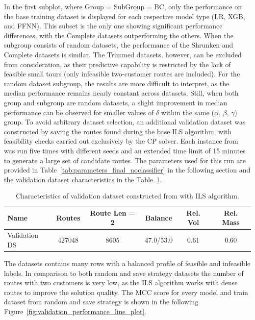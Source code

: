 In the first subplot, where Group = SubGroup = BC, only the performance on the base training dataset is
displayed for each respective model type (\gls{LR}, XGB, and \gls{FFNN}). This subset is the only one showing significant
performance differences, with the Complete datasets outperforming the others. When the subgroup consists of random datasets,
the performance of the Shrunken and Complete datasets is similar. The Trimmed datasets, however, can be excluded from consideration,
as their predictive capability is restricted by the lack of feasible small tours (only infeasible two-customer routes are included).
For the random dataset subgroup, the results are more difficult to interpret, as the median performance remains nearly constant
across datasets. Still, when both group and subgroup are random datasets, a slight improvement in median performance can
be observed for smaller values of $\delta$ within the same ($\alpha$, $\beta$, $\gamma$) group. To avoid arbitrary dataset
selection, an additional validation dataset was constructed by saving the routes found during the base \gls{ILS} algorithm,
with feasibility checks carried out exclusively by the \gls{CP} solver. Each instance from \gendreauDataSetText was run
five times with different seeds and an extended time limit of 15 minutes to generate a large set of candidate routes.
The parameters used for this run are provided in Table~\ref{tab:parameters_final_noclassifier} in the following section and
the validation dataset characteristics in the Table~\ref{tab:validation_dataset_gendreau}.
\begin{table}[!ht]
    \centering
    \small
    \begin{tabular}{l c c c c c }
        \toprule
        Name          & Routes & Route Len = 2 & Balance   & Rel. Vol & Rel. Mass \\
        \midrule
        Validation DS & 427048 & 8605          & 47.0/53.0 & 0.61     & 0.60      \\
        \bottomrule
    \end{tabular}
    \caption{Characteristics of validation dataset constructed from \gendreauDataSetText with ILS algorithm.}
    \label{tab:validation_dataset_gendreau}
\end{table}

The datasets contains many rows with a balanced profile of feasible and infeasible labels. In comparison to both
random and save strategy datasets the number of routes with two customers is very low, as the \gls{ILS} algorithm
works with dense routes to improve the solution quality. The \gls{MCC} score for every model and train dataset
from random and save strategy is shown in the following Figure~\ref{fig:validation_performance_line_plot}.

